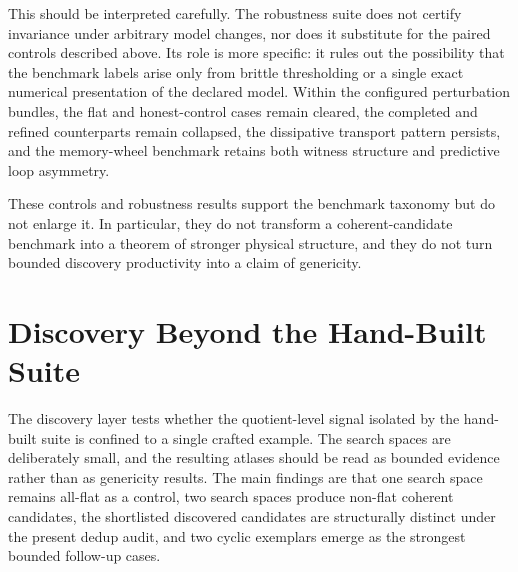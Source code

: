 \documentclass[11pt]{article}
\theoremstyle{definition}
\begin{document}
This should be interpreted carefully. The robustness suite does not certify invariance under arbitrary model changes, nor does it substitute for the paired controls described above. Its role is more specific: it rules out the possibility that the benchmark labels arise only from brittle thresholding or a single exact numerical presentation of the declared model. Within the configured perturbation bundles, the flat and honest-control cases remain cleared, the completed and refined counterparts remain collapsed, the dissipative transport pattern persists, and the memory-wheel benchmark retains both witness structure and predictive loop asymmetry.

\begin{table}[H]
\centering
\caption{Core-suite bounded robustness summary.}
\label{tab:robustness-core-suite}
\footnotesize
\setlength{\tabcolsep}{4pt}
\end{table}

These controls and robustness results support the benchmark taxonomy but do not enlarge it. In particular, they do not transform a coherent-candidate benchmark into a theorem of stronger physical structure, and they do not turn bounded discovery productivity into a claim of genericity.

\section{Discovery Beyond the Hand-Built Suite}\label{sec:discovery}
The discovery layer tests whether the quotient-level signal isolated by the hand-built suite is confined to a single crafted example. The search spaces are deliberately small, and the resulting atlases should be read as bounded evidence rather than as genericity results. The main findings are that one search space remains all-flat as a control, two search spaces produce non-flat coherent candidates, the shortlisted discovered candidates are structurally distinct under the present dedup audit, and two cyclic exemplars emerge as the strongest bounded follow-up cases.
\end{document}
